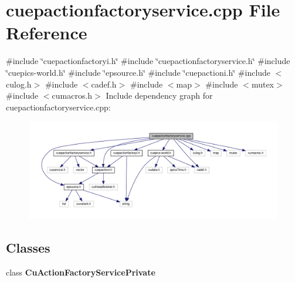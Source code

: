 \section{cuepactionfactoryservice.\+cpp File Reference}
\label{cuepactionfactoryservice_8cpp}
{\ttfamily \#include \char`\"{}cuepactionfactoryi.\+h\char`\"{}}\newline
{\ttfamily \#include \char`\"{}cuepactionfactoryservice.\+h\char`\"{}}\newline
{\ttfamily \#include \char`\"{}cuepics-\/world.\+h\char`\"{}}\newline
{\ttfamily \#include \char`\"{}epsource.\+h\char`\"{}}\newline
{\ttfamily \#include \char`\"{}cuepactioni.\+h\char`\"{}}\newline
{\ttfamily \#include $<$culog.\+h$>$}\newline
{\ttfamily \#include $<$cadef.\+h$>$}\newline
{\ttfamily \#include $<$map$>$}\newline
{\ttfamily \#include $<$mutex$>$}\newline
{\ttfamily \#include $<$cumacros.\+h$>$}\newline
Include dependency graph for cuepactionfactoryservice.\+cpp\+:\nopagebreak
\begin{figure}[H]
\begin{center}
\leavevmode
\includegraphics[width=350pt]{cuepactionfactoryservice_8cpp__incl}
\end{center}
\end{figure}
\subsection*{Classes}
\begin{DoxyCompactItemize}
\item 
class \textbf{ Cu\+Action\+Factory\+Service\+Private}
\end{DoxyCompactItemize}

